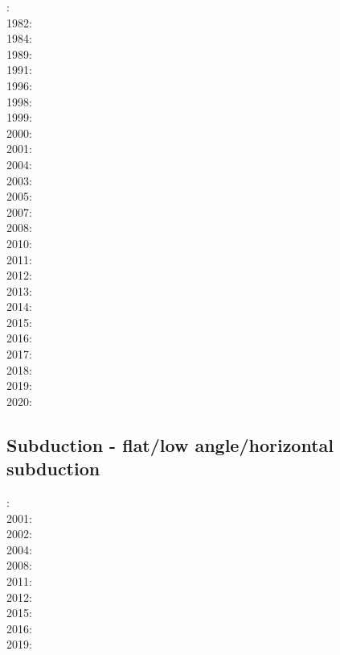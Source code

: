 {\scriptsize
{}: \cite{bird78}\\
1982: \cite{clwv82}\\
1984: \cite{cade84}\\
1989: \cite{clwv89}\\
1991: \cite{muph91}\\
1996: \cite{kest96}\\
1998: \cite{togu98}\\
1999: \cite{fagd99}\\
2000: \cite{pybf00}\\
2001: \cite{dohe01}\cite{reyb01}\cite{brry01}\\
2004: \cite{ster04}\cite{guhl04}\cite{solo04}\\
2003: \cite{hags03}\\
2005: \cite{bihi05}\\
2007: \cite{kore07}\\
2008: \cite{uegs08}\\
2010: \cite{nigm10}\cite{bucl10}\\
2011: \cite{bagw11}\cite{nigm11}\cite{legu11}\\
2012: \cite{stri12}\cite{thka12}\cite{lega12}\cite{shch12}\\
2013: \cite{dyge13}\cite{mana13}\cite{kore13}\cite{mibg13}\\
2014: \cite{recf14}\cite{macg14}\cite{crta14}\\
2015: \cite{matv15}\cite{pebu15}\cite{vapm15}\cite{legu15}\cite{gesb15}\\
2016: \cite{crta16}\cite{maka16}\cite{bags16}\\
2017: \cite{magm17}\\
2018: \cite{zhlg18}\cite{basq18}\\
2019: \cite{begb19}\cite{gubg19}\cite{ulcw19}\cite{gubg19}\\
2020: \cite{arla20}\cite{zhlg20}
}

\subsection{Subduction - flat/low angle/horizontal subduction}

{\scriptsize
{}: \cite{vavv00}\\
2001: \cite{vavv01}\\
2002: \cite{vavv02}\cite{vavv02b}\\
2004: \cite{vavv04d}\\
2008: \cite{pekh08}\cite{esfm08}\\
2011: \cite{cube11}\\
2012: \cite{mapm12}\cite{ronb12}\\
2015: \cite{gehm15}\cite{tarn15}\cite{ealw15}\\
2016: \cite{chdf16}\cite{huwc16}\cite{hulh16}\\
2019: \cite{sifg19}\cite{sams19b}\cite{malg19}
}
